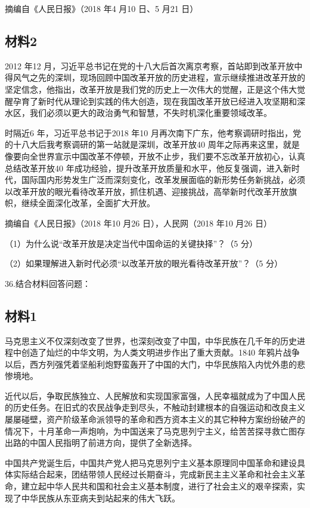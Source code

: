 \documentclass[UTF8,11pt]{ctexart}
\begin{document}
摘编自《人民日报》（2018 年4 月10 日、5 月21 日）

\subsection*{材料2}

2012 年12 月，习近平总书记在党的十八大后首次离京考察，首站即到改革开放中得风气之先的深圳，现场回顾中国改革开放的历史进程，宣示继续推进改革开放的坚定信念，他指出，改革开放是我们党的历史上一次伟大的觉醒，正是这个伟大觉醒孕育了新时代从理论到实践的伟大创造，现在我国改革开放已经进入攻坚期和深水区，我们必须以更大的政治勇气和智慧，不失时机深化重要领域改革。

时隔近6 年，习近平总书记于2018 年10 月再次南下广东，他考察调研时指出，党的十八大后我考察调研的第一站就是深圳，改革开放40 周年之际再来这里，就是像要向全世界宣示中国改革不停顿，开放不止步，我们要不忘改革开放初心，认真总结改革开放40 年成功经验，提升改革开放质量和水平，他反复强调，进入新时代，国际国内形势发生广泛而深刻变化，改革发展面临的新形势任务新挑战，必须以改革开放的眼光看待改革开放，抓住机遇、迎接挑战，高举新时代改革开放旗帜，继续全面深化改革，全面扩大开放。

摘编自《人民日报》（2018 年10 月26 日），人民网（2018 年10 月26 日）

（1）为什么说“改革开放是决定当代中国命运的关键抉择”？（5 分）


（2）如果理解进入新时代必须“以改革开放的眼光看待改革开放”？（5 分）


36.结合材料回答问题：


\subsection*{材料1}

马克思主义不仅深刻改变了世界，也深刻改变了中国，中华民族在几千年的历史进程中创造了灿烂的中华文明，为人类文明进步作出了重大贡献。1840 年鸦片战争以后，西方列强凭着坚船利炮野蛮轰开了中国的大门，中华民族陷入内忧外患的悲惨境地。

近代以后，争取民族独立、人民解放和实现国家富强，人民幸福就成为了中国人民的历史任务。在旧式的农民战争走到尽头，不触动封建根本的自强运动和改良主义屡屡碰壁，资产阶级革命派领导的革命和西方资本主义的其它种种方案纷纷破产的情况下，十月革命一声炮响，为中国送来了马克思列宁主义，给苦苦探寻救亡图存出路的中国人民指明了前进方向，提供了全新选择。

中国共产党诞生后，中国共产党人把马克思列宁主义基本原理同中国革命和建设具体实际结合起来，团结带领人民经过长期奋斗，完成新民主主义革命和社会主义革命，建立起中华人民共和国和社会主义基本制度，进行了社会主义的艰辛探索，实现了中华民族从东亚病夫到站起来的伟大飞跃。
\end{document}
